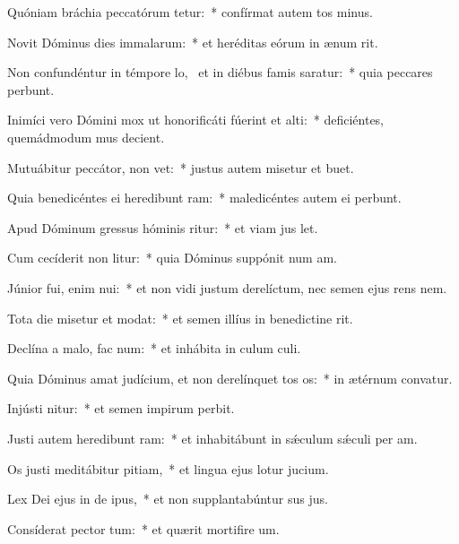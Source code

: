 \item Quóniam bráchia peccatórum tetur:~* confírmat autem tos minus.
\item Novit Dóminus dies immalarum:~* et heréditas eórum in ænum rit.
\item Non confundéntur in témpore lo,~\pscross{} et in diébus famis saratur:~* quia peccares perbunt.
\item Inimíci vero Dómini mox ut honorificáti fúerint et alti:~* deficiéntes, quemádmodum mus decient.
\item Mutuábitur peccátor,  non vet:~* justus autem misetur et buet.
\item Quia benedicéntes ei heredibunt ram:~* maledicéntes autem ei perbunt.
\item Apud Dóminum gressus hóminis ritur:~* et viam jus let.
\item Cum cecíderit non litur:~* quia Dóminus suppónit num am.
\item Júnior fui, enim nui:~* et non vidi justum derelíctum, nec semen ejus rens nem.
\item Tota die misetur et modat:~* et semen illíus in benedictine rit.
\item Declína a malo,  fac num:~* et inhábita in culum culi.
\item Quia Dóminus amat judícium, et non derelínquet tos os:~* in ætérnum convatur.
\item Injústi nitur:~* et semen impirum perbit.
\item Justi autem heredibunt ram:~* et inhabitábunt in sǽculum sǽculi per am.
\item Os justi meditábitur pitiam,~* et lingua ejus lotur jucium.
\item Lex Dei ejus in de ipus,~* et non supplantabúntur sus jus.
\item Consíderat pector tum:~* et quærit mortifire um.
